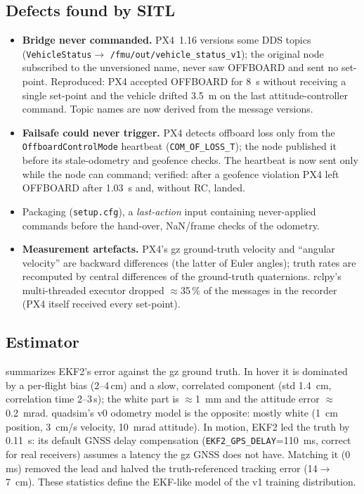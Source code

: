 \subsection{Defects found by SITL}
\begin{itemize}
\item \textbf{Bridge never commanded.} PX4~1.16 versions some DDS topics (\texttt{VehicleStatus}$\to$
\texttt{/fmu/out/vehicle\_status\_v1}); the original node subscribed to the unversioned name, never saw OFFBOARD and
sent no set-point. Reproduced: PX4 accepted OFFBOARD for \SI{8}{s} without receiving a single set-point and the vehicle
drifted \SI{3.5}{m} on the last attitude-controller command. Topic names are now derived from the message versions.
\item \textbf{Failsafe could never trigger.} PX4 detects offboard loss only from the \texttt{OffboardControlMode}
heartbeat (\texttt{COM\_OF\_LOSS\_T}); the node published it before its stale-odometry and geofence checks. The heartbeat
is now sent only while the node can command; verified: after a geofence violation PX4 left OFFBOARD after
\SI{1.03}{s} and, without RC, landed.
\item Packaging (\texttt{setup.cfg}), a \emph{last-action} input containing never-applied commands before the hand-over,
NaN/frame checks of the odometry.
\item \textbf{Measurement artefacts.} PX4's gz ground-truth velocity and ``angular velocity'' are backward differences
(the latter of Euler angles); truth rates are recomputed by central differences of the ground-truth quaternions. rclpy's
multi-threaded executor dropped $\approx$35\,\% of the messages in the recorder (PX4 itself received every set-point).
\end{itemize}

\subsection{Estimator}\label{sec:sitl-est}
 summarizes EKF2's error against the gz ground truth. In hover it is dominated by a per-flight bias
(2--4\,cm) and a slow, correlated component (std \SI{1.4}{cm}, correlation time 2--3\,s); the white part is
$\approx$\SI{1}{mm} and the attitude error $\approx$\SI{0.2}{mrad}. quadsim's v0 odometry model is the opposite: mostly
white (\SI{1}{cm} position, \SI{3}{cm/s} velocity, \SI{10}{mrad} attitude). In motion, EKF2 led the truth by
\SI{0.11}{s}: its default GNSS delay compensation (\texttt{EKF2\_GPS\_DELAY}=\SI{110}{ms}, correct for real receivers)
assumes a latency the gz GNSS does not have. Matching it (0\,ms) removed the lead and halved the truth-referenced
tracking error (14$\to$\SI{7}{cm}). These statistics define the EKF-like model of the v1 training distribution.
\begin{table}[!htbp]\centering\small
\resizebox{\linewidth}{!}{}
\caption{PX4 EKF2 error vs gz ground truth (\texttt{scripts/sitl/estimator\_stats.py}, \texttt{docs/results/sitl\_estimator.json}).}
\label{tab:sitl-est}
\end{table}

